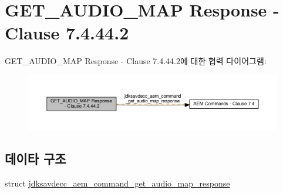 \hypertarget{group__command__get__audio__map__response}{}\section{G\+E\+T\+\_\+\+A\+U\+D\+I\+O\+\_\+\+M\+AP Response -\/ Clause 7.4.44.2}
\label{group__command__get__audio__map__response}
G\+E\+T\+\_\+\+A\+U\+D\+I\+O\+\_\+\+M\+AP Response -\/ Clause 7.4.44.2에 대한 협력 다이어그램\+:
\nopagebreak
\begin{figure}[H]
\begin{center}
\leavevmode
\includegraphics[width=350pt]{group__command__get__audio__map__response}
\end{center}
\end{figure}
\subsection*{데이타 구조}
\begin{DoxyCompactItemize}
\item 
struct \hyperlink{structjdksavdecc__aem__command__get__audio__map__response}{jdksavdecc\+\_\+aem\+\_\+command\+\_\+get\+\_\+audio\+\_\+map\+\_\+response}
\end{DoxyCompactItemize}
